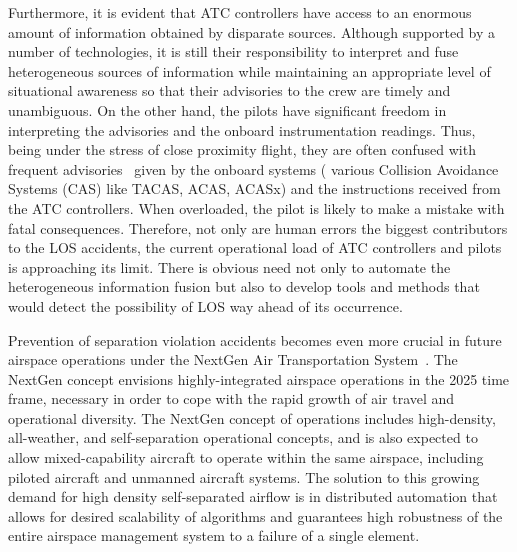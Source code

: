 \documentclass[letter,onecolumn,12pt]{aiaa-tc}
\newcommand{\1}{1_n}
\begin{document}
Furthermore, it is evident that ATC controllers have access to an enormous amount of information obtained by disparate sources. Although supported by a number of technologies, it is still their responsibility to interpret and fuse heterogeneous sources of information while maintaining an appropriate level of situational awareness so that their advisories to the crew are timely and unambiguous. On the other hand, the pilots have significant freedom in interpreting the advisories and the onboard instrumentation readings. Thus, being under the stress of close proximity flight, they are often confused with frequent advisories~\cite{Kochenderfer_2012} given by the onboard systems ( various Collision Avoidance Systems (CAS) like TACAS, ACAS, ACASx) and the instructions received from the ATC controllers. When overloaded, the pilot is likely to make a mistake with fatal consequences. Therefore, not only are human errors the biggest contributors to the LOS accidents, the current operational load of ATC controllers and pilots is approaching its limit. There is obvious need not only to automate the heterogeneous information fusion but also to develop tools and methods that would detect the possibility of LOS way ahead of its occurrence.


Prevention of separation violation accidents becomes even more crucial in future airspace operations under the NextGen Air Transportation  System~\cite{NextGen_ConOps}. The NextGen concept envisions highly-integrated airspace operations in the 2025 time frame, necessary in order to cope with the rapid growth of air travel and operational diversity. The NextGen concept of operations includes high-density, all-weather, and self-separation operational concepts, and is also expected to allow mixed-capability aircraft to operate within the same airspace, including piloted aircraft and unmanned aircraft systems. The solution to this growing demand for high density self-separated airflow is in distributed automation that allows for desired scalability of algorithms and guarantees high robustness of the entire airspace management system to a failure of a single element.
\end{document}
